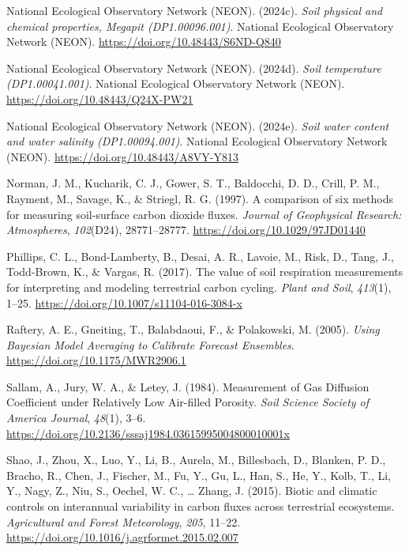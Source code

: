 \documentclass[
  letterpaper,
  DIV=11,
  numbers=noendperiod]{scrartcl}
\newlength{\cslhangindent}
\newenvironment{CSLReferences}[2] %
 {\begin{list}{}{%
  \setlength{\itemindent}{0pt}
  \setlength{\leftmargin}{0pt}
  \setlength{\parsep}{0pt}
  \ifodd #1
   \setlength{\leftmargin}{\cslhangindent}
   \setlength{\itemindent}{-1\cslhangindent}
  \fi
  \setlength{\itemsep}{#2\baselineskip}}}
 {\end{list}}
\begin{document}
\begin{CSLReferences}{1}{0}
National Ecological Observatory Network (NEON). (2024c). \emph{Soil
physical and chemical properties, {Megapit} ({DP1}.00096.001)}. National
Ecological Observatory Network (NEON).
\url{https://doi.org/10.48443/S6ND-Q840}

National Ecological Observatory Network (NEON). (2024d). \emph{Soil
temperature ({DP1}.00041.001)}. National Ecological Observatory Network
(NEON). \url{https://doi.org/10.48443/Q24X-PW21}

National Ecological Observatory Network (NEON). (2024e). \emph{Soil
water content and water salinity ({DP1}.00094.001)}. National Ecological
Observatory Network (NEON). \url{https://doi.org/10.48443/A8VY-Y813}

Norman, J. M., Kucharik, C. J., Gower, S. T., Baldocchi, D. D., Crill,
P. M., Rayment, M., Savage, K., \& Striegl, R. G. (1997). A comparison
of six methods for measuring soil-surface carbon dioxide fluxes.
\emph{Journal of Geophysical Research: Atmospheres}, \emph{102}(D24),
28771--28777. \url{https://doi.org/10.1029/97JD01440}

Phillips, C. L., Bond-Lamberty, B., Desai, A. R., Lavoie, M., Risk, D.,
Tang, J., Todd-Brown, K., \& Vargas, R. (2017). The value of soil
respiration measurements for interpreting and modeling terrestrial
carbon cycling. \emph{Plant and Soil}, \emph{413}(1), 1--25.
\url{https://doi.org/10.1007/s11104-016-3084-x}

Raftery, A. E., Gneiting, T., Balabdaoui, F., \& Polakowski, M. (2005).
\emph{Using {Bayesian Model Averaging} to {Calibrate Forecast
Ensembles}}. \url{https://doi.org/10.1175/MWR2906.1}

Sallam, A., Jury, W. A., \& Letey, J. (1984). Measurement of {Gas
Diffusion Coefficient} under {Relatively Low Air}-filled {Porosity}.
\emph{Soil Science Society of America Journal}, \emph{48}(1), 3--6.
\url{https://doi.org/10.2136/sssaj1984.03615995004800010001x}

Shao, J., Zhou, X., Luo, Y., Li, B., Aurela, M., Billesbach, D.,
Blanken, P. D., Bracho, R., Chen, J., Fischer, M., Fu, Y., Gu, L., Han,
S., He, Y., Kolb, T., Li, Y., Nagy, Z., Niu, S., Oechel, W. C., \ldots{}
Zhang, J. (2015). Biotic and climatic controls on interannual
variability in carbon fluxes across terrestrial ecosystems.
\emph{Agricultural and Forest Meteorology}, \emph{205}, 11--22.
\url{https://doi.org/10.1016/j.agrformet.2015.02.007}


\end{CSLReferences}
\end{document}
